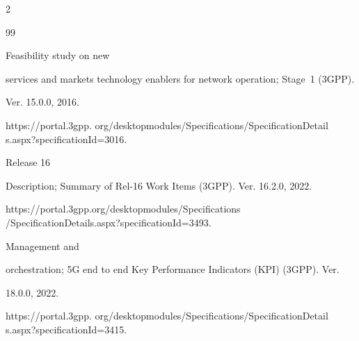 \begin{multicols}{2}
\begin{enumerate}[(1)]
\end{enumerate}








{\small\frenchspacing


 {%




 \begin{thebibliography}{99}










 Feasibility study on new 


services and markets technology enablers for network operation; Stage~1 (3GPP). 


Ver. 15.0.0, 2016. 


{\sf https://portal.3gpp. org/desktopmodules/Specifications/SpecificationDetail s.aspx?specificationId=3016}.







 Release 16 


Description; Summary of Rel-16 Work Items (3GPP). Ver. 16.2.0, 2022. 


{\sf https://portal.3gpp.org/desktopmodules/Specifications /SpecificationDetails.aspx?specificationId=3493}.













 Management and 


orchestration; 5G end to end Key Performance Indicators (KPI) (3GPP). Ver. 


18.0.0, 2022. 


{\sf https://portal.3gpp. org/desktopmodules/Specifications/SpecificationDetail s.aspx?specificationId=3415}.






\end{thebibliography}}}
\end{multicols}
